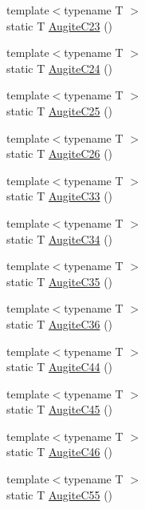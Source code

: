 \begin{DoxyCompactItemize}
\item 
{\footnotesize template$<$typename T $>$ }\\static T \mbox{\hyperlink{namespacempc_1_1data_a8a954ec986d04b54100564aee10f66c1}{Augite\+C23}} ()
\item 
{\footnotesize template$<$typename T $>$ }\\static T \mbox{\hyperlink{namespacempc_1_1data_ac1713a0302180a0455721a3782d5a034}{Augite\+C24}} ()
\item 
{\footnotesize template$<$typename T $>$ }\\static T \mbox{\hyperlink{namespacempc_1_1data_a2db867527e844bcd4b6e7da9bee97d7f}{Augite\+C25}} ()
\item 
{\footnotesize template$<$typename T $>$ }\\static T \mbox{\hyperlink{namespacempc_1_1data_a96496f5ce74e903c5ba2596632171cf8}{Augite\+C26}} ()
\item 
{\footnotesize template$<$typename T $>$ }\\static T \mbox{\hyperlink{namespacempc_1_1data_ad16dafe49c4ce862479eae0a64f345c8}{Augite\+C33}} ()
\item 
{\footnotesize template$<$typename T $>$ }\\static T \mbox{\hyperlink{namespacempc_1_1data_a36d398961bf68abdca32ac0dfad83dd3}{Augite\+C34}} ()
\item 
{\footnotesize template$<$typename T $>$ }\\static T \mbox{\hyperlink{namespacempc_1_1data_ab3051069261729f1758f5b0cdb45965e}{Augite\+C35}} ()
\item 
{\footnotesize template$<$typename T $>$ }\\static T \mbox{\hyperlink{namespacempc_1_1data_a1e2cd3ace01804d86c8905f8d65bdf25}{Augite\+C36}} ()
\item 
{\footnotesize template$<$typename T $>$ }\\static T \mbox{\hyperlink{namespacempc_1_1data_a63404b2605c4917b00ae328f754a6752}{Augite\+C44}} ()
\item 
{\footnotesize template$<$typename T $>$ }\\static T \mbox{\hyperlink{namespacempc_1_1data_a4ca932db778c26d988634f2b04176813}{Augite\+C45}} ()
\item 
{\footnotesize template$<$typename T $>$ }\\static T \mbox{\hyperlink{namespacempc_1_1data_ae4bad6f0493690a3ec7c8f1f196f2dee}{Augite\+C46}} ()
\item 
{\footnotesize template$<$typename T $>$ }\\static T \mbox{\hyperlink{namespacempc_1_1data_a2da60e27c288386552357af94b308cc4}{Augite\+C55}} ()

\end{DoxyCompactItemize}
